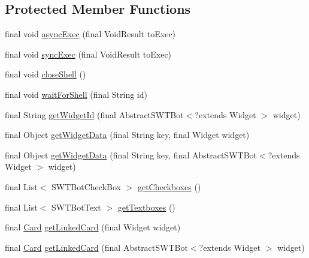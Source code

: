 \subsection*{\-Protected \-Member \-Functions}
\begin{DoxyCompactItemize}
\item 
final void \hyperlink{classdominion_1_1view_1_1utils_1_1SWTBotBase_a66a1f98057ee8b36f717ab7b9b3810e7}{async\-Exec} (final \-Void\-Result to\-Exec)
\item 
final void \hyperlink{classdominion_1_1view_1_1utils_1_1SWTBotBase_aa7f1990436d80ca18ac0e02a78f6ea79}{sync\-Exec} (final \-Void\-Result to\-Exec)
\item 
final void \hyperlink{classdominion_1_1view_1_1utils_1_1SWTBotBase_a8d548ef82d4b3db1808e3da14fb82786}{close\-Shell} ()
\item 
final void \hyperlink{classdominion_1_1view_1_1utils_1_1SWTBotBase_aeea7f052c365a3342662facad21cc021}{wait\-For\-Shell} (final \-String id)
\item 
final \-String \hyperlink{classdominion_1_1view_1_1utils_1_1SWTBotBase_a2af2f995332f83412a937edfcf4412b6}{get\-Widget\-Id} (final \-Abstract\-S\-W\-T\-Bot$<$?extends \-Widget $>$ widget)
\item 
final \-Object \hyperlink{classdominion_1_1view_1_1utils_1_1SWTBotBase_a35d4d77ca8fe0b32bfa69f1d08e3065d}{get\-Widget\-Data} (final \-String key, final \-Widget widget)
\item 
final \-Object \hyperlink{classdominion_1_1view_1_1utils_1_1SWTBotBase_a9466205a11f331a50dd60ae4c81db781}{get\-Widget\-Data} (final \-String key, final \-Abstract\-S\-W\-T\-Bot$<$?extends \-Widget $>$ widget)
\item 
final \-List$<$ \-S\-W\-T\-Bot\-Check\-Box $>$ \hyperlink{classdominion_1_1view_1_1utils_1_1SWTBotBase_addbca7c3d37454ff960a322118ab54f0}{get\-Checkboxes} ()
\item 
final \-List$<$ \-S\-W\-T\-Bot\-Text $>$ \hyperlink{classdominion_1_1view_1_1utils_1_1SWTBotBase_ade008fbfb98355e85a120b299c97e5ae}{get\-Textboxes} ()
\item 
final \hyperlink{interfacedominion_1_1model_1_1cards_1_1Card}{\-Card} \hyperlink{classdominion_1_1view_1_1utils_1_1SWTBotBase_a24bad8153eb7ab74f0e8e2c6c06b4b70}{get\-Linked\-Card} (final \-Widget widget)
\item 
final \hyperlink{interfacedominion_1_1model_1_1cards_1_1Card}{\-Card} \hyperlink{classdominion_1_1view_1_1utils_1_1SWTBotBase_abd525765da78c2952598f6282cf2292a}{get\-Linked\-Card} (final \-Abstract\-S\-W\-T\-Bot$<$?extends \-Widget $>$ widget)

\end{DoxyCompactItemize}
